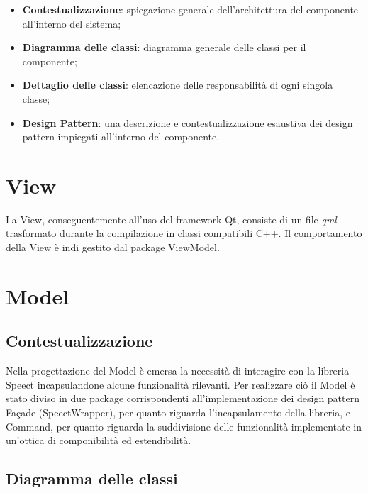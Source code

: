 \documentclass[openany,12pt,a4paper]{report}
\begin{document}
\begin{itemize}
	\item \textbf{Contestualizzazione}: spiegazione generale dell'architettura del componente all'interno del sistema;
	\item \textbf{Diagramma delle classi}: diagramma generale delle classi per il componente;
	\item \textbf{Dettaglio delle classi}: elencazione delle responsabilità di ogni singola classe;
	\item \textbf{Design Pattern}: una descrizione e contestualizzazione esaustiva dei design pattern impiegati all'interno del componente.
\end{itemize} 

\section{View}

La View, conseguentemente all’uso del framework Qt, consiste di un file \textit{qml} trasformato durante la compilazione in classi compatibili C++. Il comportamento della View è indi gestito dal package ViewModel. 

\section{Model}

\subsection{Contestualizzazione}

Nella progettazione del Model è emersa la necessità di interagire con la libreria Speect incapsulandone alcune funzionalità rilevanti. Per realizzare ciò il Model è stato diviso in due package corrispondenti all'implementazione dei design pattern Façade (SpeectWrapper), per quanto riguarda l'incapsulamento della libreria, e Command, per quanto riguarda la suddivisione delle funzionalità implementate in un'ottica di componibilità ed estendibilità.  

\subsection{Diagramma delle classi}
\end{document}
